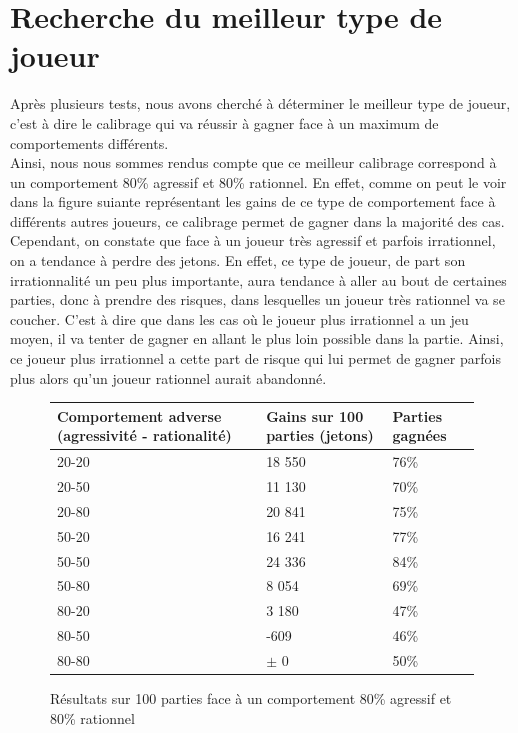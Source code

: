 \documentclass{report}
\begin{document}
\section{Recherche du meilleur type de joueur}
\hspace{0.5cm}Après plusieurs tests, nous avons cherché à déterminer le meilleur type de joueur, c'est à dire le calibrage qui va réussir à gagner face à un maximum de comportements différents.\\

Ainsi, nous nous sommes rendus compte que ce meilleur calibrage correspond à un comportement 80\% agressif et 80\% rationnel. En effet, comme on peut le voir dans la figure suiante représentant les gains de ce type de comportement face à différents autres joueurs, ce calibrage permet de gagner dans la majorité des cas. Cependant, on constate que face à un joueur très agressif et parfois irrationnel, on a tendance à perdre des jetons. En effet, ce type de joueur, de part son irrationnalité un peu plus importante, aura tendance à aller au bout de certaines parties, donc à prendre des risques, dans lesquelles un joueur très rationnel va se coucher. C'est à dire que dans les cas où le joueur plus irrationnel a un jeu moyen, il va tenter de gagner en allant le plus loin possible dans la partie. Ainsi, ce joueur plus irrationnel a cette part de risque qui lui permet de gagner parfois plus alors qu'un joueur rationnel aurait abandonné.\\

\begin{figure}[H]
\hspace{-2cm}
\begin{tabular}{|l|l|l|}
\hline
Comportement adverse (agressivité - rationalité) & Gains sur 100 parties (jetons) &	Parties gagnées \\
\hline
20-20	 & 18 550 &	76\% \\
\hline
20-50 	&	11 130 &	 70\%\\
\hline
20-80 & 20 841 &	75\% \\
\hline
50-20 &	16 241 &	 77\% \\
\hline
50-50 &	24 336 &	 84\% \\
\hline
50-80 &	8 054 &  69\% \\
\hline
80-20 &	3 180 &	47\% \\
\hline
80-50 & 	-609 &	46\% \\
\hline
80-80 & $\pm$ 0  & 50\% \\
\hline
\end{tabular}

\caption{Résultats sur 100 parties face à un comportement 80\% agressif et 80\% rationnel}
\end{figure}
\end{document}
